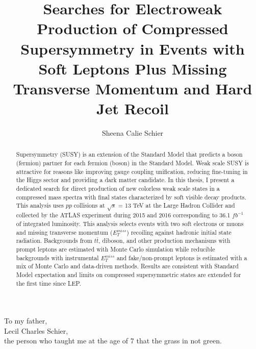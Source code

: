 \documentclass[11pt]{ucthesis}
\begin{document}

\title{Searches for Electroweak Production of Compressed Supersymmetry in Events with Soft Leptons Plus Missing Transverse Momentum and Hard Jet Recoil}
\author{Sheena Calie Schier}
\deanlinethree{}

\begin{frontmatter}

\maketitle
\copyrightpage

\tableofcontents
\listoffigures
\listoftables

\begin{abstract}
Supersymmetry (SUSY) is an extension of the Standard Model that predicts a boson (fermion) partner for each fermion (boson) in the Standard Model. Weak scale SUSY is attractive for reasons like improving gauge coupling unification, reducing fine-tuning in the Higgs sector and providing a dark matter candidate. In this thesis, I present a dedicated search for direct production of new colorless weak scale states in a compressed mass spectra with final states characterized by soft visible decay products. This analysis uses $pp$ collisions at $\sqrt s$ = 13 TeV at the Large Hadron Collider and collected by the ATLAS experiment during 2015 and 2016 corresponding to 36.1 $fb^{-1}$ of integrated luminosity. This analysis selects events with two soft electrons or muons and missing transverse momentum ($E_T^{miss}$) recoiling against hadronic initial state radiation. Backgrounds from $t\bar{t}$, diboson, and other production mechanisms with prompt leptons are estimated with Monte Carlo
simulation while reducible backgrounds with instrumental $E_T^{miss}$ and fake/non-prompt leptons is estimated with a mix of Monte Carlo and data-driven methods. Results are consistent with Standard Model expectation and limits on compressed supersymmetric states are extended for the first time since LEP.

\end{abstract}

\begin{dedication}
\null\vfil
{\large
\begin{center}
To my father,\\\vspace{12pt}
Lecil Charles Schier,\\\vspace{12pt}
the person who taught me at the age of 7 that the grass in not green.
\end{center}}
\vfil\null
\end{dedication}



\end{frontmatter}
\end{document}
